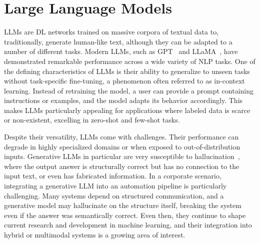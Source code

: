 

\section{Large Language Models}

\glspl{LLM} are \gls{DL} networks trained on massive corpora of textual data to, traditionally, generate human-like text, although they can be adapted to a number of different tasks. Modern LLMs, such as GPT~\cite{brown_language_2020} and LLaMA~\cite{touvron_llama_2023}, have demonstrated remarkable performance across a wide variety of \gls{NLP} tasks. One of the defining characteristics of LLMs is their ability to generalize to unseen tasks without task-specific fine-tuning, a phenomenon often referred to as in-context learning. Instead of retraining the model, a user can provide a prompt containing instructions or examples, and the model adapts its behavior accordingly. This makes LLMs particularly appealing for applications where labeled data is scarce or non-existent, excelling in zero-shot and few-shot tasks.

Despite their versatility, LLMs come with challenges. Their performance can degrade in highly specialized domains or when exposed to out-of-distribution inputs. Generative LLMs in particular are very susceptible to hallucination~\cite{ji_survey_2023}, where the output answer is structurally correct but has no connection to the input text, or even has fabricated information. In a corporate scenario, integrating a generative LLM into an automation pipeline is particularly challenging. Many systems depend on structured communication, and a generative model may hallucinate on the structure itself, breaking the system even if the answer was semantically correct. Even then, they continue to shape current research and development in machine learning, and their integration into hybrid or multimodal systems is a growing area of interest.


